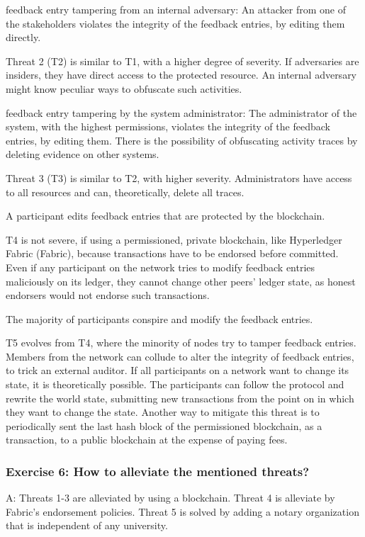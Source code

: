 \documentclass[12pt,a4paper]{article}
\begin{document}
\begin{threat}{feedback entry tampering from an internal adversary:} An attacker from one of the stakeholders violates the integrity of the feedback entries, by editing them directly.
\end{threat}

Threat 2 (T2) is similar to T1, with a higher degree of severity. If adversaries are insiders, they have direct access to the protected resource. An internal adversary might know peculiar ways to obfuscate such activities.

\begin{threat}{feedback entry tampering by the system administrator:} The administrator of the system, with the highest permissions, violates the integrity of the feedback entries, by editing them. There is the possibility of obfuscating activity traces by deleting evidence on other systems.
\end{threat}

Threat 3 (T3) is similar to T2, with higher severity. Administrators have access to all resources and can, theoretically, delete all traces. 

\begin{threat}{A participant edits feedback entries that are protected by the blockchain.}
\end{threat}

T4 is not severe, if using a permissioned, private blockchain, like Hyperledger Fabric (Fabric), because transactions have to be endorsed before committed. Even if any participant on the network tries to modify feedback entries maliciously on its ledger, they cannot change other peers' ledger state, as honest endorsers would not endorse such transactions. 

\begin{threat}The majority of participants conspire and modify the feedback entries.
\end{threat}

T5 evolves from T4, where the minority of nodes try to tamper feedback entries. Members from the network can collude to alter the integrity of feedback entries, to trick an external auditor. If all participants on a network want to change its state, it is theoretically possible. The participants can follow the protocol and rewrite the world state, submitting new transactions from the point on in which they want to change the state. Another way to mitigate this threat is to periodically sent the last hash block of the permissioned blockchain, as a transaction, to a public blockchain at the expense of paying fees.  

\subsubsection*{Exercise 6: How to alleviate the mentioned threats?}
A: Threats 1-3 are alleviated by using a blockchain. Threat 4 is alleviate by Fabric's endorsement policies. Threat 5 is solved by adding a notary organization that is independent of any university.



\end{document}
